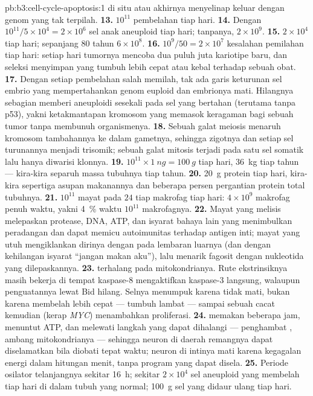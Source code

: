 \begin{solution}{pb:b3:cell-cycle-apoptosis:1}
di situ atau akhirnya menyelinap keluar dengan genom yang tak terpilah.
\textbf{13.} $10^{11}$ pembelahan tiap hari.
\textbf{14.} Dengan  $10^{11}/5\times 10^{4} = 2\times 10^{6}$
sel anak aneuploid tiap hari; tanpanya, $2\times 10^{9}$.
\textbf{15.} $2\times 10^{4}$ tiap hari; sepanjang $80$ tahun $6\times 10^{8}$.
\textbf{16.} $10^{9}/50 = 2\times 10^{7}$ kesalahan pemilahan tiap hari:
setiap hari tumornya mencoba dua puluh juta kariotipe baru, dan seleksi
menyimpan yang tumbuh lebih cepat atau kebal terhadap sebuah obat.
\textbf{17.} Dengan setiap pembelahan salah memilah, tak ada garis keturunan
sel embrio yang mempertahankan genom euploid dan embrionya mati. Hilangnya
sebagian memberi aneuploidi sesekali pada sel yang bertahan (terutama tanpa
p53), yakni ketakmantapan kromosom yang memasok keragaman bagi sebuah tumor
tanpa membunuh organismenya.
\textbf{18.} Sebuah galat meiosis menaruh kromosom tambahannya ke dalam
gametnya, sehingga zigotnya dan setiap sel turunannya menjadi trisomik;
sebuah galat mitosis terjadi pada satu sel somatik lalu hanya diwarisi klonnya.
\textbf{19.} $10^{11}\times \qty{1}{ng} = \qty{100}{g}$ tiap hari,
\qty{36}{kg} tiap tahun --- kira-kira separuh massa tubuhnya tiap tahun.
\textbf{20.} \qty{20}{g} protein tiap hari, kira-kira sepertiga asupan
makanannya dan beberapa persen pergantian protein total tubuhnya.
\textbf{21.} $10^{11}$ mayat pada $24$ tiap makrofag tiap hari: $4\times
10^{9}$ makrofag penuh waktu, yakni \qty{4}{\%} waktu $10^{11}$
makrofagnya.
\textbf{22.} Mayat yang melisis melepaskan protease, DNA, ATP, dan isyarat
bahaya lain yang menimbulkan peradangan dan dapat memicu autoimunitas
terhadap antigen inti; mayat yang utuh mengiklankan dirinya dengan
 pada lembaran luarnya (dan dengan kehilangan isyarat ``jangan
makan aku''), lalu menarik fagosit dengan nukleotida yang dilepaskannya.
\textbf{23.}  terhalang pada mitokondrianya. Rute
ekstrinsiknya masih bekerja di tempat kaspase-8 mengaktifkan kaspase-3
langsung, walaupun penguatannya lewat Bid hilang. Selnya
menumpuk karena tidak mati, bukan karena membelah lebih cepat --- tumbuh
lambat --- sampai sebuah cacat kemudian (kerap \emph{MYC}) menambahkan proliferasi.
\textbf{24.}  memakan beberapa jam, menuntut ATP, dan melewati
langkah yang dapat dihalangi --- penghambat , ambang mitokondrianya ---
sehingga neuron di daerah remangnya dapat diselamatkan bila diobati tepat
waktu; neuron di intinya mati karena kegagalan energi dalam hitungan menit,
tanpa program yang dapat disela.
\textbf{25.} Periode osilator telanjangnya sekitar \qty{16}{h}; sekitar $2\times
10^{4}$ sel aneuploid yang membelah tiap hari di dalam tubuh yang normal;
\qty{100}{g} sel yang didaur ulang  tiap hari.
\end{solution}
